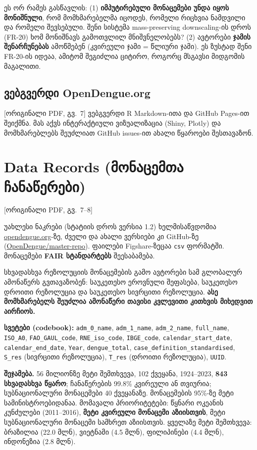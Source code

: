 \documentclass[11pt,a4paper]{article}
\newcommand{\imp}[1]{\textbf{\color{importred}#1}}
\newcommand{\pg}[1]{{\small\color{gray}[ორიგინალი PDF, გვ.~#1]}}
\begin{document}
\begin{etl}
ეს ორ რამეს გასწავლის: (1) \imp{იმპუტირებული მონაცემები უნდა იყოს მონიშნული}, რომ მომხმარებელმა იცოდეს, რომელი რიცხვია
ნამდვილი და რომელი შევსებული. შენი სისტემა mass-preserving downscaling-ის დროს (FR-20) ხომ მონიშნავს გამოთვლილ მნიშვნელობებს?
(2) ავტორები \imp{ჯამის შენარჩუნებას} ამოწმებენ (კვირეული ჯამი = წლიური ჯამი). ეს ზუსტად შენი FR-20-ის იდეაა, ამიტომ შეგიძლია
ციტირო, როგორც მსგავსი მიდგომის მაგალითი.
\end{etl}

\subsection*{ვებგვერდი OpenDengue.org} \pg{7}
ვებგვერდი R Markdown-ითა და GitHub Pages-ით შეიქმნა. მას აქვს ინტერაქტიული ვიზუალიზაცია (Shiny, Plotly) და მომხმარებლებს შეუძლიათ
GitHub issues-ით ახალი წყაროები შესთავაზონ.

\section{Data Records (მონაცემთა ჩანაწერები)} \pg{7--8}

უახლესი ნაკრები (სტატიის დროს ვერსია 1.2) ხელმისაწვდომია \href{https://opendengue.org/data.html}{opendengue.org}-ზე, ძველი და
ახალი ვერსიები კი GitHub-ზე (\href{https://github.com/OpenDengue/master-repo}{OpenDengue/master-repo}). ფაილები Figshare-ზეცაა
\texttt{csv} ფორმატში. მონაცემები \imp{FAIR სტანდარტებს} შეესაბამება.

სხვადასხვა რეზოლუციის მონაცემების გამო ავტორები სამ გლობალურ ამონაწერს გვთავაზობენ: საუკეთესო ეროვნული შეფასება, საუკეთესო
დროითი რეზოლუცია და საუკეთესო სივრცითი რეზოლუცია. \imp{ასე მომხმარებელს შეუძლია ამონაწერი თავისი კვლევითი კითხვის მიხედვით აირჩიოს.}

\textbf{სვეტები (codebook):} \texttt{adm\_0\_name}, \texttt{adm\_1\_name}, \texttt{adm\_2\_name}, \texttt{full\_name}, \texttt{ISO\_A0},
\texttt{FAO\_GAUL\_code}, \texttt{RNE\_iso\_code}, \texttt{IBGE\_code}, \texttt{calendar\_start\_date}, \texttt{calendar\_end\_date},
\texttt{Year}, \texttt{dengue\_total}, \texttt{case\_definition\_standardised}, \texttt{S\_res} (სივრცითი რეზოლუცია), \texttt{T\_res}
(დროითი რეზოლუცია), \texttt{UUID}.

\textbf{შეჯამება.} 56 მილიონზე მეტი შემთხვევა, 102 ქვეყანა, 1924--2023, \imp{843 სხვადასხვა წყარო}; ჩანაწერების 99.8\% კვირეული ან
თვიურია; სუბნაციონალური მონაცემები 40 ქვეყანაზე. მონაცემების 95\%-ზე მეტი სამინისტროებიდანაა. მომავალი პრიორიტეტები: წყნარი
ოკეანის კუნძულები (2011--2016), \imp{მეტი კვირეული მონაცემი აზიისთვის}, მეტი სუბნაციონალური მონაცემი სამხრეთ აზიისთვის.
ყველაზე მეტი შემთხვევა: ბრაზილია (22.0 მლნ), ვიეტნამი (4.5 მლნ), ფილიპინები (4.4 მლნ), ინდონეზია (2.8 მლნ).
\end{document}
